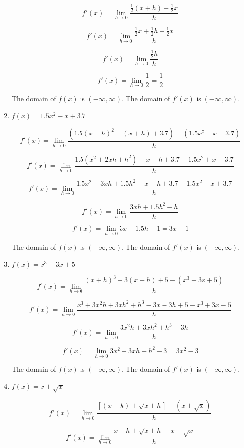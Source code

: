 \documentclass{article}
\begin{document}
\begin{enumerate}
			$$f'(x) = \lim \limits _{h \to 0} \frac{ \frac{1}{2}(x+h) - \frac{1}{2}x }{h}$$

			$$f'(x) = \lim \limits _{h \to 0} \frac{ \frac{1}{2}x + \frac{1}{2}h - \frac{1}{2}x}{h}$$

			$$f'(x) = \lim \limits _{h \to 0} \frac{ \frac{1}{2}h }{h}$$

			$$f'(x) = \lim \limits _{h \to 0} \frac{1}{2} = \frac{1}{2}$$

			The domain of $f(x)$ is $(-\infty, \infty)$. The domain of $f'(x)$ is $(-\infty, \infty)$.

		\item $f(x) = 1.5x^2 - x + 3.7$

			$$f'(x) = \lim \limits _{h \to 0} \frac{(1.5(x+h)^2 - (x+h) + 3.7) - (1.5x^2 - x + 3.7)}{h}$$

			$$f'(x) = \lim \limits _{h \to 0} \frac{1.5(x^2 + 2xh + h^2)-x-h+3.7 - 1.5x^2 + x - 3.7}{h}$$

			$$f'(x) = \lim \limits _{h \to 0} \frac{1.5x^2 + 3xh + 1.5h^2 - x - h + 3.7 - 1.5x^2 - x + 3.7}{h}$$

			$$f'(x) = \lim \limits _{h \to 0} \frac{3xh + 1.5h^2 - h}{h}$$

			$$f'(x) = \lim \limits _{h \to 0} 3x + 1.5h - 1 = 3x - 1$$

			The domain of $f(x)$ is $(-\infty, \infty)$. The domain of $f'(x)$ is $(-\infty, \infty)$.

		\item $f(x) = x^3 - 3x + 5$

			$$f'(x) = \lim \limits _{h \to 0} \frac{(x+h)^3 - 3(x+h) + 5 - (x^3-3x+5)}{h}$$

			$$f'(x) = \lim \limits _{h \to 0} \frac{x^3 + 3x^2h + 3xh^2 + h^3 - 3x - 3h + 5 - x^3 + 3x - 5}{h}$$

			$$f'(x) = \lim \limits _{h \to 0} \frac{3x^2h +3xh^2 + h^3 - 3h}{h}$$

			$$f'(x) = \lim \limits _{h \to 0} 3x^2 + 3xh + h^2 - 3 = 3x^2 - 3$$

			The domain of $f(x)$ is $(-\infty, \infty)$. The domain of $f'(x)$ is $(-\infty, \infty)$.

		\item $f(x) = x + \sqrt{x}$

			$$f'(x) = \lim \limits _{h \to 0} \frac{ [(x+h) + \sqrt{x+h}] - (x + \sqrt{x})}{h}$$

			$$f'(x) = \lim \limits _{h \to 0} \frac{x + h + \sqrt{x+h} - x - \sqrt{x}}{h}$$


\end{enumerate}
\end{document}
